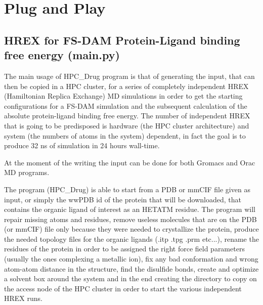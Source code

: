 

\section{Plug and Play}

	\subsection{HREX for FS-DAM Protein-Ligand binding free energy (main.py)}
	
		The main usage of HPC\_Drug program is that of generating the input, that can then be copied in a HPC cluster, for a series of completely independent HREX (Hamiltonian Replica Exchange) MD simulations in order to get the starting configurations for a FS-DAM simulation and the subsequent calculation of the absolute protein-ligand binding free energy. The number of independent HREX that is going to be predisposed is hardware (the HPC cluster architecture) and system (the numbers of atoms in the system) dependent, in fact the goal is to produce 32 ns of simulation in 24 hours wall-time.
		
		At the moment of the writing the input can be done for both Gromacs\cite{gromacs_ABRAHAM201519} and Orac\cite{orac} MD programs.
		
		The program (HPC\_Drug) is able to start from a PDB or mmCIF file given as input, or simply the wwPDB id of the protein that will be downloaded, that contains the organic ligand of interest as an HETATM residue. The program will repair missing atoms and residues, remove useless molecules that are on the PDB (or mmCIF) file only because they were needed to crystallize the protein, produce the needed topology files for the organic ligands (.itp .tpg .prm etc...), rename the residues of the protein in order to be assigned the right force field parameters (usually the ones complexing a metallic ion), fix any bad conformation and wrong atom-atom distance in the structure, find the disulfide bonds, create and optimize a solvent box around the system and in the end creating the directory to copy on the access node of the HPC cluster in order to start the various independent HREX runs.
		
